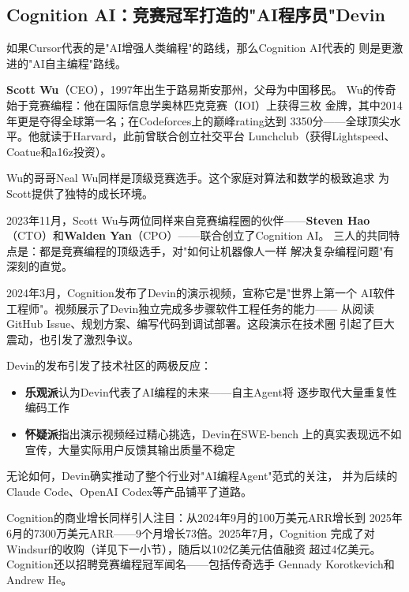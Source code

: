\subsection{Cognition AI：竞赛冠军打造的"AI程序员"Devin}
\label{subsec:founders-cognition}

如果Cursor代表的是"AI增强人类编程"的路线，那么Cognition AI代表的
则是更激进的"AI自主编程"路线。

\textbf{Scott Wu}（CEO），1997年出生于路易斯安那州，父母为中国移民。
Wu的传奇始于竞赛编程：他在国际信息学奥林匹克竞赛（IOI）上获得三枚
金牌，其中2014年更是夺得全球第一名；在Codeforces上的巅峰rating达到
3350分——全球顶尖水平。他就读于Harvard，此前曾联合创立社交平台
Lunchclub（获得Lightspeed、Coatue和a16z投资）。

Wu的哥哥Neal Wu同样是顶级竞赛选手。这个家庭对算法和数学的极致追求
为Scott提供了独特的成长环境。

2023年11月，Scott Wu与两位同样来自竞赛编程圈的伙伴——\textbf{Steven
Hao}（CTO）和\textbf{Walden Yan}（CPO）——联合创立了Cognition AI。
三人的共同特点是：都是竞赛编程的顶级选手，对"如何让机器像人一样
解决复杂编程问题"有深刻的直觉。

2024年3月，Cognition发布了Devin的演示视频，宣称它是"世界上第一个
AI软件工程师"。视频展示了Devin独立完成多步骤软件工程任务的能力——
从阅读GitHub Issue、规划方案、编写代码到调试部署。这段演示在技术圈
引起了巨大震动，也引发了激烈争议。

\begin{whybox}
Devin的发布引发了技术社区的两极反应：
\begin{itemize}
  \item \textbf{乐观派}认为Devin代表了AI编程的未来——自主Agent将
    逐步取代大量重复性编码工作
  \item \textbf{怀疑派}指出演示视频经过精心挑选，Devin在SWE-bench
    上的真实表现远不如宣传，大量实际用户反馈其输出质量不稳定
\end{itemize}
无论如何，Devin确实推动了整个行业对"AI编程Agent"范式的关注，
并为后续的Claude Code、OpenAI Codex等产品铺平了道路。
\end{whybox}

Cognition的商业增长同样引人注目：从2024年9月的100万美元ARR增长到
2025年6月的7300万美元ARR——9个月增长73倍。2025年7月，Cognition
完成了对Windsurf的收购（详见下一小节），随后以102亿美元估值融资
超过4亿美元。Cognition还以招聘竞赛编程冠军闻名——包括传奇选手
Gennady Korotkevich和Andrew He。

